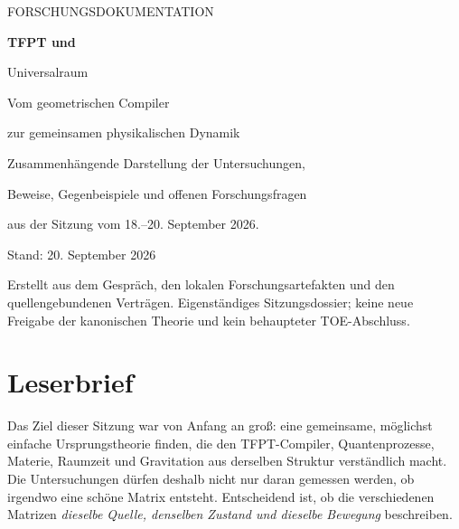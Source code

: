 
\hypersetup{pageanchor=false}
\begin{titlepage}
\color{ink}
{\sffamily\large FORSCHUNGSDOKUMENTATION\par}
\vspace{17mm}
{\sffamily\bfseries\fontsize{32}{37}\selectfont TFPT und\par Universalraum\par}
\vspace{7mm}
{\sffamily\Large Vom geometrischen Compiler\par zur gemeinsamen physikalischen Dynamik\par}
\vspace{12mm}
\par
\vspace{9mm}
{\large Zusammenhängende Darstellung der Untersuchungen,\par Beweise, Gegenbeispiele und offenen Forschungsfragen\par aus der Sitzung vom 18.--20. September 2026.\par}
\vfill
{}
\vspace{5mm}
{\sffamily Stand: 20. September 2026\par}
{\small Erstellt aus dem Gespräch, den lokalen Forschungsartefakten und den quellengebundenen Verträgen. Eigenständiges Sitzungsdossier; keine neue Freigabe der kanonischen Theorie und kein behaupteter TOE-Abschluss.\par}
\end{titlepage}
\hypersetup{pageanchor=true}
\chapter*{Leserbrief}
Das Ziel dieser Sitzung war von Anfang an groß: eine gemeinsame, möglichst einfache Ursprungstheorie finden, die den TFPT-Compiler, Quantenprozesse, Materie, Raumzeit und Gravitation aus derselben Struktur verständlich macht. Die Untersuchungen dürfen deshalb nicht nur daran gemessen werden, ob irgendwo eine schöne Matrix entsteht. Entscheidend ist, ob die verschiedenen Matrizen \emph{dieselbe Quelle, denselben Zustand und dieselbe Bewegung} beschreiben.

